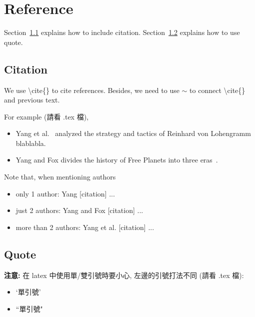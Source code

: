\chapter{Reference}
\label{chapter:ref}

Section~\ref{sec:citation} explains how to include citation.
Section~\ref{sec:quote} explains how to use quote.

\section{Citation}
\label{sec:citation}

We use \textbackslash cite\{\} to cite references.
Besides, we need to use $\sim$ to connect \textbackslash cite\{\} and previous text.

For example (請看 .tex 檔),
\begin{itemize}
\item Yang et al.~\cite{Yang_2016} analyzed the strategy and tactics of Reinhard von Lohengramm blablabla.
\item Yang and Fox divides the history of Free Planets into three eras~\cite{Yang_2017}.
\end{itemize}

Note that, when mentioning authors
\begin{itemize}
\item only 1 author: Yang [citation] ...
\item just 2 authors: Yang and Fox [citation] ...
\item more than 2 authors: Yang et al. [citation] ...
\end{itemize}

\section{Quote}
\label{sec:quote}

\textbf{注意:} 在 latex 中使用單/雙引號時要小心, 左邊的引號打法不同 (請看 .tex 檔):
\begin{itemize}
\item `單引號'
\item ``單引號"
\end{itemize}
